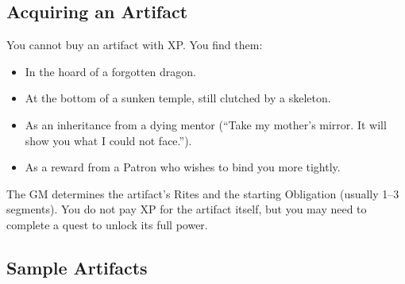 \subsection{Acquiring an Artifact}

You cannot buy an artifact with XP. You find them:

\begin{itemize}
  \item In the hoard of a forgotten dragon.
  \item At the bottom of a sunken temple, still clutched by a skeleton.
  \item As an inheritance from a dying mentor (``Take my mother's mirror. It will show you what I could not face.'').
  \item As a reward from a Patron who wishes to bind you more tightly.
\end{itemize}

The GM determines the artifact's Rites and the starting Obligation (usually 1--3 segments). You do not pay XP for the artifact itself, but you may need to complete a quest to unlock its full power.

\subsection{Sample Artifacts}

